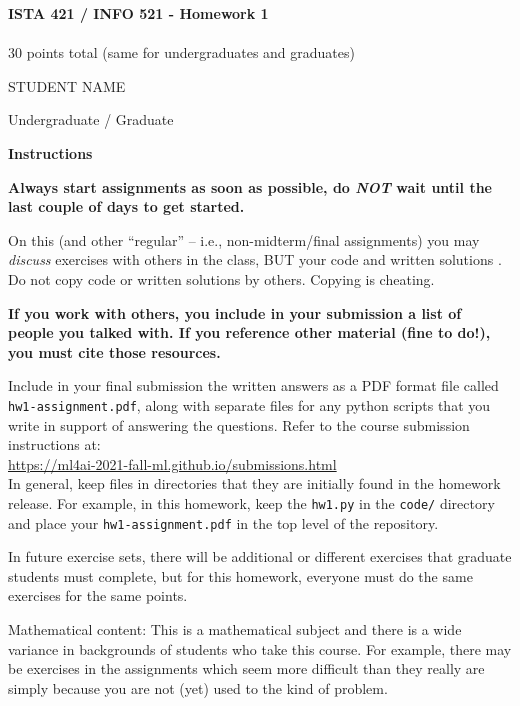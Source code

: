 \documentclass[10pt]{article}
\begin{document}
\begin{center}
    {\Large {\bf ISTA 421 / INFO 521 - Homework 1}} \\
     \\
    30 points total (same for undergraduates and graduates) \\
    \vspace{1cm}
\end{center}

\begin{flushright}
STUDENT NAME  %

Undergraduate / Graduate %
\end{flushright}

\vspace{1cm}

{\Large {\bf Instructions}}

{\bf Always start assignments as soon as possible, do {\em NOT} wait until the last couple of days to get started.}

On this (and other ``regular'' -- i.e., non-midterm/final assignments) you may {\em discuss} exercises with others in the class, BUT your code and written solutions .  Do not copy code or written solutions by others. Copying is cheating.

{\bf If you work with others, you  include in your submission a list of people you talked with.  If you reference other material (fine to do!), you must cite those resources.}

Include in your final submission the written answers as a PDF format file called {\tt hw1-assignment.pdf}, along with separate files for any python scripts that you write in support of answering the questions. 
Refer to the course submission instructions at: \\
\url{https://ml4ai-2021-fall-ml.github.io/submissions.html} \\
In general, keep files in directories that they are initially found in the homework release. For example, in this homework, keep the {\tt hw1.py} in the {\tt code/} directory and place your {\tt hw1-assignment.pdf} in the top level of the repository.

In future exercise sets, there will be additional or different exercises that graduate students must complete, but for this homework, everyone must do the same exercises for the same points.

Mathematical content: This is a mathematical subject and there is a wide variance in backgrounds of students who take this course. For example, there may be exercises in the assignments which seem more difficult than they really are simply because you are not (yet) used to the kind of problem. 
\end{document}
